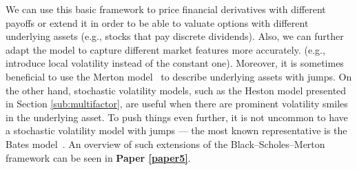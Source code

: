 \documentclass{UUThesisTemplate}
\begin{document}
\par
We can use this basic framework to price financial derivatives with different payoffs or extend it in order to be able to valuate options with different underlying assets (e.g., stocks that pay discrete dividends). Also, we can further adapt the model to capture different market features more accurately. (e.g., introduce local volatility instead of the constant one). Moreover, it is sometimes beneficial to use the Merton model~\cite{merton1976option} to describe underlying assets with jumps. On the other hand, stochastic volatility models, such as the Heston model presented in Section \ref{sub:multifactor}, are useful when there are prominent volatility smiles in the underlying asset. To push things even further, it is not uncommon to have a stochastic volatility model with jumps --- the most known representative is the Bates model~\cite{bates1996jumps}. An overview of such extensions of the Black--Scholes--Merton framework can be seen in \textbf{Paper \ref{paper5}}.
%
%
\end{document}
